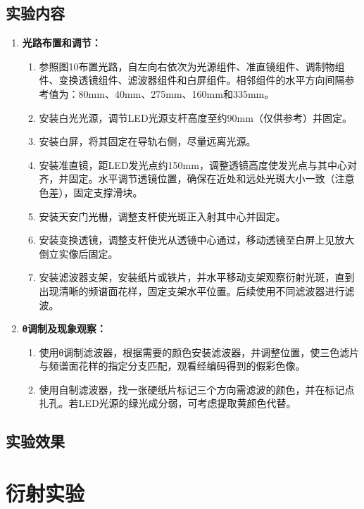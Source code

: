 \documentclass[zihao=5, UTF8]{article}
\theoremstyle{MyLineTheoremStyle} %
\theoremstyle{MyBlockTheoremStyle} %
\theoremstyle{MySubsubsectionStyle} %
\begin{document}
\subsection{实验内容}

\begin{enumerate}
    \item \textbf{光路布置和调节：}
    \begin{enumerate}
        \item 参照图10布置光路，自左向右依次为光源组件、准直镜组件、调制物组件、变换透镜组件、滤波器组件和白屏组件。相邻组件的水平方向间隔参考值为：80mm、40mm、275mm、160mm和335mm。
        \item 安装白光光源，调节LED光源支杆高度至约90mm（仅供参考）并固定。
        \item 安装白屏，将其固定在导轨右侧，尽量远离光源。
        \item 安装准直镜，距LED发光点约150mm，调整透镜高度使发光点与其中心对齐，并固定。水平调节透镜位置，确保在近处和远处光斑大小一致（注意色差），固定支撑滑块。
        \item 安装天安门光栅，调整支杆使光斑正入射其中心并固定。
        \item 安装变换透镜，调整支杆使光从透镜中心通过，移动透镜至白屏上见放大倒立实像后固定。
        \item 安装滤波器支架，安装纸片或铁片，并水平移动支架观察衍射光斑，直到出现清晰的频谱面花样，固定支架水平位置。后续使用不同滤波器进行滤波。
    \end{enumerate}

    \item \textbf{θ调制及现象观察：}
    \begin{enumerate}
        \item 使用θ调制滤波器，根据需要的颜色安装滤波器，并调整位置，使三色滤片与频谱面花样的指定分支匹配，观看经编码得到的假彩色像。
        \item 使用自制滤波器，找一张硬纸片标记三个方向需滤波的颜色，并在标记点扎孔。若LED光源的绿光成分弱，可考虑提取黄颜色代替。
    \end{enumerate}
\end{enumerate}

\subsection{实验效果}



\section{衍射实验}
\end{document}

